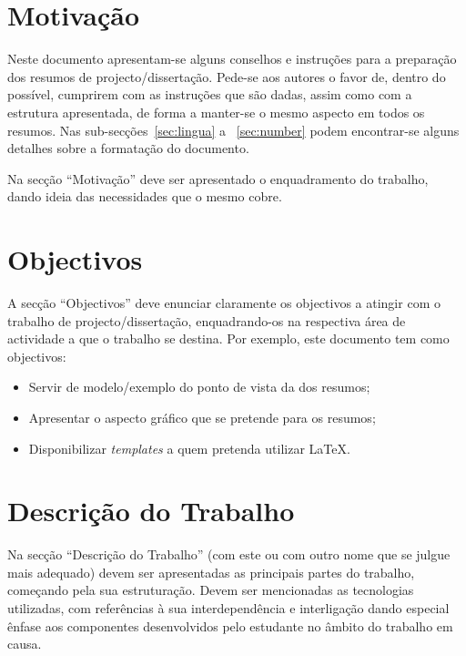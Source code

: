 \documentclass[9pt,a4paper]{extarticle}
\begin{document}
\begin{multicols}{2}

\section{Motivação}\label{sec:motiva}

Neste documento apresentam-se alguns conselhos e instruções para a preparação dos resumos de projecto/dissertação. 
Pede-se aos autores o favor de, dentro do possível, cumprirem com as instruções que são dadas, assim como com a estrutura apresentada, de forma a manter-se o mesmo aspecto em todos os resumos. 
Nas sub-secções~\ref{sec:lingua} a ~\ref{sec:number} podem encontrar-se alguns detalhes sobre a formatação do documento. 

Na secção ``Motivação'' deve ser apresentado o enquadramento do trabalho, dando ideia das necessidades que o mesmo cobre.

\section{Objectivos}\label{sec:goals}

A secção ``Objectivos'' deve enunciar claramente os objectivos a atingir com o trabalho de projecto/dissertação, enquadrando-os na respectiva área de actividade a que o trabalho se destina. 
Por exemplo, este documento tem como objectivos:
\begin{itemize}
\item Servir de modelo/exemplo do ponto de vista da dos resumos;
\item Apresentar o aspecto gráfico que se pretende para os resumos;
\item Disponibilizar \emph{templates} a quem pretenda utilizar \LaTeX.
\end{itemize}

\section{Descrição do Trabalho}\label{sec:work}

Na secção ``Descrição do Trabalho'' (com este ou com outro nome que se julgue mais adequado) devem ser apresentadas as principais partes do trabalho, começando pela sua estruturação. Devem ser mencionadas as tecnologias utilizadas, com referências à sua interdependência e interligação dando especial ênfase aos componentes desenvolvidos pelo estudante no âmbito do trabalho em causa.


\end{multicols}
\end{document}
